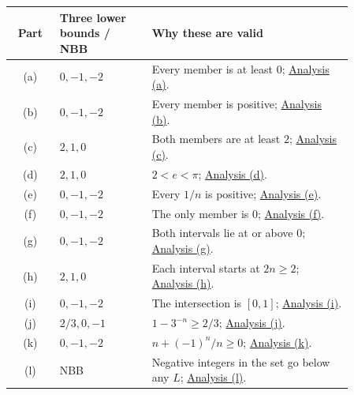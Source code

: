 \begin{center}
\begin{tabular}{@{}c@{\quad}p{0.27\linewidth}@{\quad}p{0.59\linewidth}@{}}
\toprule
Part&Three lower bounds / NBB&Why these are valid\\ \midrule
(a)&$0,-1,-2$&Every member is at least $0$; \hyperref[bounds:a]{Analysis (a)}.\\
(b)&$0,-1,-2$&Every member is positive; \hyperref[bounds:b]{Analysis (b)}.\\
(c)&$2,1,0$&Both members are at least $2$; \hyperref[bounds:c]{Analysis (c)}.\\
(d)&$2,1,0$&$2<e<\pi$; \hyperref[bounds:d]{Analysis (d)}.\\
(e)&$0,-1,-2$&Every $1/n$ is positive; \hyperref[bounds:e]{Analysis (e)}.\\
(f)&$0,-1,-2$&The only member is $0$; \hyperref[bounds:f]{Analysis (f)}.\\
(g)&$0,-1,-2$&Both intervals lie at or above $0$; \hyperref[bounds:g]{Analysis (g)}.\\
(h)&$2,1,0$&Each interval starts at $2n\geq2$; \hyperref[bounds:h]{Analysis (h)}.\\
(i)&$0,-1,-2$&The intersection is $[0,1]$; \hyperref[bounds:i]{Analysis (i)}.\\
(j)&$2/3,0,-1$&$1-3^{-n}\geq2/3$; \hyperref[bounds:j]{Analysis (j)}.\\
(k)&$0,-1,-2$&$n+(-1)^n/n\geq0$; \hyperref[bounds:k]{Analysis (k)}.\\
(l)&NBB&Negative integers in the set go below any $L$; \hyperref[bounds:l]{Analysis (l)}.\\
\bottomrule
\end{tabular}
\end{center}


